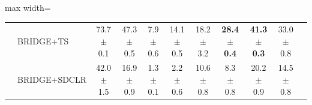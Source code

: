 \begin{table}[t]
\begin{adjustbox}{max width=\textwidth}
\begin{tabular}{l l c c c c c c c c c}
 & BRIDGE+TS & 73.7 {\scriptsize$\pm$ 0.1} & 47.3 {\scriptsize$\pm$ 0.5} & 7.9 {\scriptsize$\pm$ 0.6} & 14.1 {\scriptsize$\pm$ 0.5} & 18.2 {\scriptsize$\pm$ 3.2} & \textbf{28.4 {\scriptsize$\pm$ 0.4}} & \textbf{41.3 {\scriptsize$\pm$ 0.3}} & 33.0 {\scriptsize$\pm$ 0.8} \\
 & BRIDGE+SDCLR & 42.0 {\scriptsize$\pm$ 1.5} & 16.9 {\scriptsize$\pm$ 0.9} & 1.3 {\scriptsize$\pm$ 0.1} & 2.2 {\scriptsize$\pm$ 0.6} & 10.6 {\scriptsize$\pm$ 0.8} & 8.3 {\scriptsize$\pm$ 0.8} & 20.2 {\scriptsize$\pm$ 0.9} & 14.5 {\scriptsize$\pm$ 0.8} \\
\bottomrule
\end{tabular}
\end{adjustbox}
\end{table}

